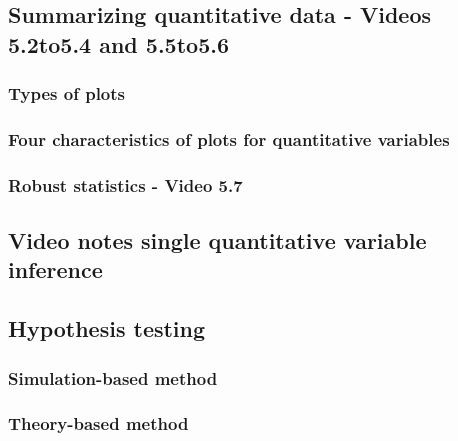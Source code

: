\documentclass[
]{report}
\begin{document}
\subsection*{Summarizing quantitative data - Videos 5.2to5.4 and 5.5to5.6}\label{summarizing-quantitative-data---videos-5.2to5.4-and-5.5to5.6}

\subsubsection*{Types of plots}\label{types-of-plots}

\subsubsection*{Four characteristics of plots for quantitative variables}\label{four-characteristics-of-plots-for-quantitative-variables}

\subsubsection*{Robust statistics - Video 5.7}\label{robust-statistics---video-5.7}

\subsection{Video notes single quantitative variable inference}\label{video-notes-single-quantitative-variable-inference}

\subsection*{Hypothesis testing}\label{hypothesis-testing-2}

\subsubsection*{Simulation-based method}\label{simulation-based-method-2}

\subsubsection*{Theory-based method}\label{theory-based-method-1}
\end{document}
